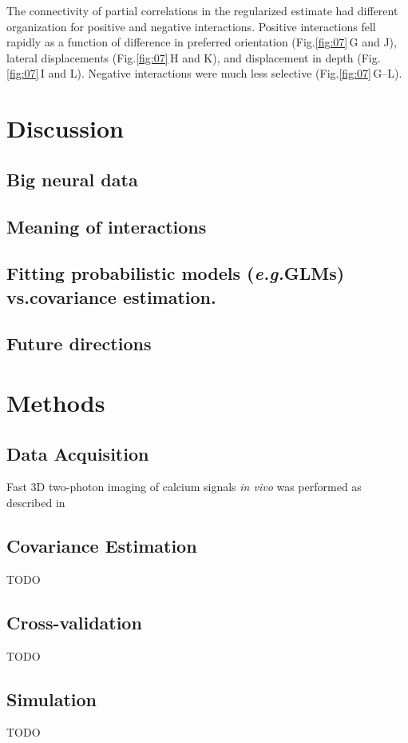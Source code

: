 \documentclass[10pt]{article}
\begin{document}
The connectivity of partial correlations in the regularized estimate had different organization for positive and negative interactions. Positive interactions fell rapidly as a function of difference in preferred orientation (Fig.\;\ref{fig:07}\,G and J), lateral displacements (Fig.\;\ref{fig:07}\,H and K), and displacement in depth (Fig.\;\ref{fig:07}\,I and L). Negative interactions were much less selective (Fig.\;\ref{fig:07}\,G--L).


\section*{Discussion}
\subsection*{Big neural data}
\subsection*{Meaning of interactions}
\subsection*{Fitting probabilistic models (\emph{e.g.}\;GLMs) vs.\;covariance estimation.}
\subsection*{Future directions}

\section*{Methods}
\subsection*{Data Acquisition}
Fast 3D two-photon imaging of calcium signals \emph{in vivo} was performed as described in \cite{Cotton:2013}
\subsection*{Covariance Estimation}
TODO
\subsection*{Cross-validation}
TODO
\subsection*{Simulation}
TODO
\end{document}
